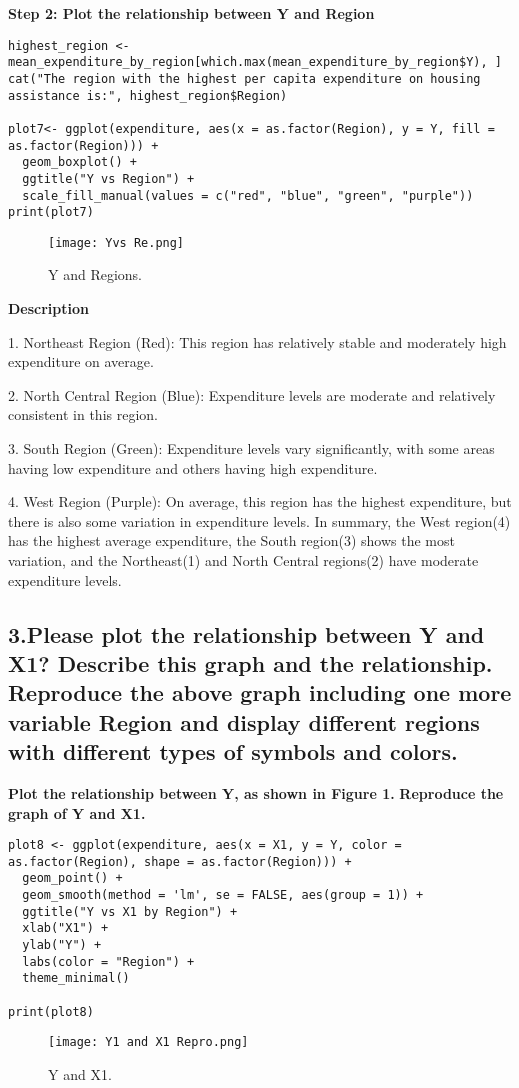\documentclass[12pt]{article}
\begin{document}
\textbf{Step 2: Plot the relationship between Y and Region}

\begin{lstlisting}[style=my]
highest_region <- mean_expenditure_by_region[which.max(mean_expenditure_by_region$Y), ]
cat("The region with the highest per capita expenditure on housing assistance is:", highest_region$Region)

plot7<- ggplot(expenditure, aes(x = as.factor(Region), y = Y, fill = as.factor(Region))) + 
  geom_boxplot() + 
  ggtitle("Y vs Region") + 
  scale_fill_manual(values = c("red", "blue", "green", "purple"))
print(plot7)
\end{lstlisting}
\begin{figure}[h!]\centering
	\caption{\footnotesize  Y and Regions.}
	\label{fig:plot_1}
	\texttt{[image: Yvs Re.png]}
\end{figure}
 
 
 
 \textbf{Description }

1. Northeast Region (Red): This region has relatively stable and moderately high expenditure on average.

2. North Central Region (Blue): Expenditure levels are moderate and relatively consistent in this region.

3. South Region (Green): Expenditure levels vary significantly, with some areas having low expenditure and others having high expenditure.

4. West Region (Purple): On average, this region has the highest expenditure, but there is also some variation in expenditure levels.
\newpage
In summary, the West region(4) has the highest average expenditure, the South region(3) shows the most variation, and the Northeast(1) and North Central regions(2) have moderate expenditure levels. 

\subsection*{3.Please plot the relationship between Y and X1? Describe this graph and the relationship. Reproduce the above graph including one more variable Region and display
different regions with different types of symbols and colors.}
\vspace{14pt}
  \textbf{ Plot the relationship between Y, as shown in Figure 1.}
\newpage
\textbf{Reproduce the graph of Y and X1.}

\begin{lstlisting}[style =my]
plot8 <- ggplot(expenditure, aes(x = X1, y = Y, color = as.factor(Region), shape = as.factor(Region))) + 
  geom_point() + 
  geom_smooth(method = 'lm', se = FALSE, aes(group = 1)) + 
  ggtitle("Y vs X1 by Region") +
  xlab("X1") +
  ylab("Y") +
  labs(color = "Region") +
  theme_minimal()

print(plot8)
\end{lstlisting}
\begin{figure}[h!]\centering
	\caption{\footnotesize  Y and X1.}
	\label{fig:plot_1}
	\texttt{[image: Y1 and X1 Repro.png]}
\end{figure}
\end{document}
